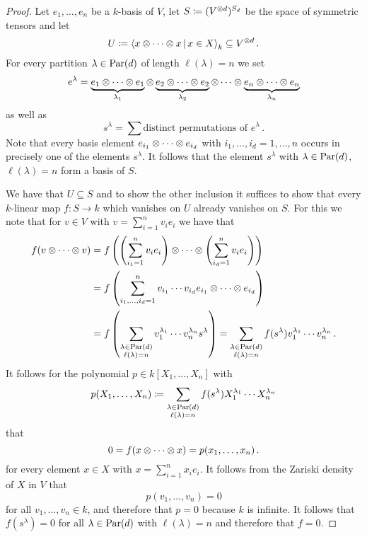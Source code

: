 \begin{proof}
  Let $e_1, \dotsc, e_n$ be a $k$-basis of $V$, let $S \coloneqq (V^{\mathbin{\otimes} d})^{S_d}$ be the space of symmetric tensors and let
  \[
              U
    \defined \gen{ x \tensor \dotsb \tensor x \suchthat x \in X }_k
    \subseteq V^{\tensor d} \,.
  \]
  For every partition $\lambda \in \operatorname{Par}(d)$ of length $\ell(\lambda) = n$ we set
  \[
      e^\lambda
    =         \underbrace{e_1 \mathbin{\otimes} \dotsb \mathbin{\otimes} e_1}_{\lambda_1}
      \mathbin{\otimes} \underbrace{e_2 \mathbin{\otimes} \dotsb \mathbin{\otimes} e_2}_{\lambda_2}
      \mathbin{\otimes} \dotsb
      \mathbin{\otimes} \underbrace{e_n \mathbin{\otimes} \dotsb \mathbin{\otimes} e_n}_{\lambda_n}
  \]
  as well as
  \[
      s^\lambda
    = \sum \text{distinct permutations of $e^\lambda$} \,.
  \]
  Note that every basis element $e_{i_1} \mathbin{\otimes} \dotsb \mathbin{\otimes} e_{i_d}$ with $i_1, \dotsc, i_d = 1, \dotsc, n$ occurs in precisely one of the elements $s^\lambda$.
  It follows that the element $s^\lambda$ with $\lambda \in \operatorname{Par}(d)$, $\ell(\lambda) = n$ form a basis of $S$.
  
  We have that $U \subseteq S$ and to show the other inclusion it suffices to show that every $k$-linear map $f \colon S \to k$ which vanishes on $U$ already vanishes on $S$.
  For this we note that for $v \in V$ with $v = \sum_{i=1}^n v_i e_i$ we have that
  \begin{align*}
        f(v \mathbin{\otimes} \dotsb \mathbin{\otimes} v)
    &=  f\left(
          \left( \sum_{i_1=1}^n v_i e_i \right)
          \mathbin{\otimes} \dotsb \mathbin{\otimes}
          \left( \sum_{i_d=1}^n v_i e_i \right)
        \right)
    \\
    &=  f\left(
          \sum_{i_1, \dotsc, i_d = 1}^n
          v_{i_1} \dotsm v_{i_d}
          e_{i_1} \mathbin{\otimes} \dotsb \mathbin{\otimes} e_{i_d}
        \right)
    \\
    &=  f\left(
          \sum_{\substack{\lambda \in \operatorname{Par}(d) \\ \ell(\lambda) = n}}
          v_1^{\lambda_1} \dotsm v_n^{\lambda _n}
          s^\lambda
        \right)
     =  \sum_{\substack{\lambda \in \operatorname{Par}(d) \\ \ell(\lambda) = n}}
        f(s^\lambda)
        v_1^{\lambda_1} \dotsm v_n^{\lambda _n} \,.
  \end{align*}
  It follows for the polynomial $p \in k[X_1, \dotsc, X_n]$ with
  \[
              p(X_1, \dotsc, X_n)
    \coloneqq  \sum_{\substack{\lambda \in \operatorname{Par}(d) \\ \ell(\lambda) = n}}
              f( s^\lambda )
              X_1^{\lambda_1} \dotsm X_n^{\lambda_n}
  \]
  that
  \[
      0
    = f(x \mathbin{\otimes} \dotsb \mathbin{\otimes} x)
    = p(x_1, \dotsc, x_n) \,.
  \]
  for every element $x \in X$ with $x = \sum_{i=1}^n x_i e_i$.
  It follows from the Zariski density of $X$ in $V$ that
  \[
      p(v_1, \dotsc, v_n)
    = 0
  \]
  for all $v_1, \dotsc, v_n \in k$, and therefore that $p = 0$ because $k$ is infinite.
  It follows that $f(s^\lambda) = 0$ for all $\lambda \in \operatorname{Par}(d)$ with $\ell(\lambda) = n$ and therefore that $f = 0$.
\end{proof}


